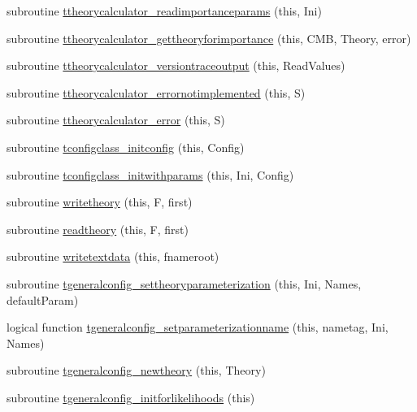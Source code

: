 \begin{DoxyCompactItemize}
\item 
subroutine \mbox{\hyperlink{namespacegeneraltypes_a207649e7d9a305b79b0016f9e5aae2d9}{ttheorycalculator\+\_\+readimportanceparams}} (this, Ini)
\item 
subroutine \mbox{\hyperlink{namespacegeneraltypes_a46caf82f82aed371c7f69a0168e9167b}{ttheorycalculator\+\_\+gettheoryforimportance}} (this, C\+MB, Theory, error)
\item 
subroutine \mbox{\hyperlink{namespacegeneraltypes_a79e614b9322bb431dd5c0cf1abde00ca}{ttheorycalculator\+\_\+versiontraceoutput}} (this, Read\+Values)
\item 
subroutine \mbox{\hyperlink{namespacegeneraltypes_af10543377b813170c5ba69fe2ebfdd44}{ttheorycalculator\+\_\+errornotimplemented}} (this, S)
\item 
subroutine \mbox{\hyperlink{namespacegeneraltypes_aa6c88f0919f7ac7fa030824300d48018}{ttheorycalculator\+\_\+error}} (this, S)
\item 
subroutine \mbox{\hyperlink{namespacegeneraltypes_a55eb95d894b131cff41c56b99c9f87cc}{tconfigclass\+\_\+initconfig}} (this, Config)
\item 
subroutine \mbox{\hyperlink{namespacegeneraltypes_ab4499296c04e7fca434f77eecbccea27}{tconfigclass\+\_\+initwithparams}} (this, Ini, Config)
\item 
subroutine \mbox{\hyperlink{namespacegeneraltypes_a739d15405356622a778b42627a1d39d4}{writetheory}} (this, F, first)
\item 
subroutine \mbox{\hyperlink{namespacegeneraltypes_aaa999beeb15e5412eba1146d1250b25f}{readtheory}} (this, F, first)
\item 
subroutine \mbox{\hyperlink{namespacegeneraltypes_a845e7a28effceab63f5aed42a4bf066a}{writetextdata}} (this, fnameroot)
\item 
subroutine \mbox{\hyperlink{namespacegeneraltypes_a9ebf4d67be70717d4385bd575cc2300f}{tgeneralconfig\+\_\+settheoryparameterization}} (this, Ini, Names, default\+Param)
\item 
logical function \mbox{\hyperlink{namespacegeneraltypes_a86a26412494e782acd18ef23abfc46b4}{tgeneralconfig\+\_\+setparameterizationname}} (this, nametag, Ini, Names)
\item 
subroutine \mbox{\hyperlink{namespacegeneraltypes_a510e50b9adaf980266f3c8160135f409}{tgeneralconfig\+\_\+newtheory}} (this, Theory)
\item 
subroutine \mbox{\hyperlink{namespacegeneraltypes_ad67421d900a21e6dc1a5d34ea7bc77fe}{tgeneralconfig\+\_\+initforlikelihoods}} (this)
\item 

\end{DoxyCompactItemize}
